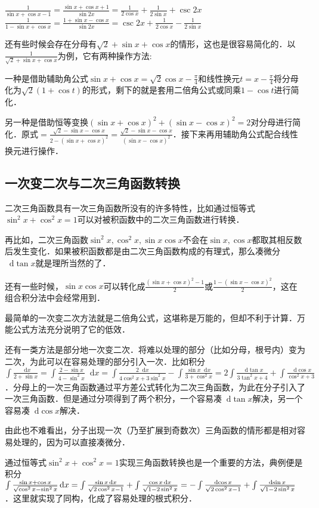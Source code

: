 \documentclass{ctexbook}
\newcommand*{\dif}{\mathop{}\!\mathrm{d}}
\begin{document}
$\frac{1}{\sin{x}+\cos{x}-1}=\frac{\sin{x}+\cos{x}+1}{\sin{2x}}=\frac{1}{2\cos{x}}+\frac{1}{2\sin{x}}+\csc{2x}$\\
$\frac{1}{1-\sin{x}+\cos{x}}=\frac{1+\sin{x}-\cos{x}}{\sin{2x}}=\csc{2x}+\frac{1}{2\cos{x}}-\frac{1}{2\sin{x}}$\par
还有些时候会存在分母有$\sqrt{2}+\sin{x}+\cos{x}$的情形，这也是很容易简化的．以$\frac{1}{\sqrt{2}+\sin{x}+\cos{x}}$为例，它有两种操作方法:\par
一种是借助辅助角公式$\sin{x}+\cos{x}=\sqrt{2}\cos{x-\frac{\pi}{4}}$和线性换元$t=x-\frac{\pi}{4}$将分母化为$\sqrt{2}\left(1+\cos{t}\right)$的形式，剩下的就是套用二倍角公式或同乘$1-\cos{t}$进行简化．\par
另一种是借助恒等变换$\left(\sin{x}+\cos{x}\right)^{2}+\left(\sin{x}-\cos{x}\right)^{2}=2$对分母进行简化．原式$=\frac{\sqrt{2}-\sin{x}-\cos{x}}{2-\left(\sin{x}+\cos{x}\right)^{2}}=\frac{\sqrt{2}-\sin{x}-\cos{x}}{\left(\sin{x}-\cos{x}\right)^{2}}$．接下来再用辅助角公式配合线性换元进行操作．\par
\subsection{一次变二次与二次三角函数转换}
二次三角函数具有一次三角函数所没有的许多特性，比如通过恒等式$\sin^{2}{x}+\cos^{2}{x}=1$可以对被积函数中的二次三角函数进行转换．\par
再比如，二次三角函数$\sin^{2}{x},\cos^{2}{x},\sin{x}\cos{x}$不会在$\sin{x},\cos{x}$都取其相反数后发生变化．如果被积函数都是由二次三角函数构成的有理式，那么凑微分$\dif{\tan{x}}$就是理所当然的了．\par
还有一些时候，$\sin{x}\cos{x}$可以转化成$\frac{\left(\sin{x}+\cos{x}\right)^{2}-1}{2}$或$\frac{1-\left(\sin{x}-\cos{x}\right)^{2}}{2}$，这在组合积分法中会经常用到．\par
最简单的一次变二次方法就是二倍角公式，这堪称是万能的，但却不利于计算．万能公式方法充分说明了它的低效．\par
还有一类方法是部分地一次变二次．将难以处理的部分（比如分母，根号内）变为二次，为此可以在容易处理的部分引入一次．比如积分$\int\frac{\dif{x}}{2+\sin{x}}=\int\frac{2-\sin{x}}{4-\sin^{2}{x}}\dif{x}=\int\frac{2\dif{x}}{4\cos^{2}{x}+3\sin^{2}{x}}-\int\frac{\sin{x}\dif{x}}{3+\cos^{2}{x}}=2\int\frac{\dif{\tan{x}}}{3\tan^{2}{x}+4}+\int\frac{\dif{\cos{x}}}{\cos^{2}{x}+3}$．分母上的一次三角函数通过平方差公式转化为二次三角函数，为此在分子引入了一次三角函数．但是通过分项得到了两个积分，一个容易凑$\dif{\tan{x}}$解决，另一个容易凑$\dif{\cos{x}}$解决．\par
由此也不难看出，分子出现一次（乃至扩展到奇数次）三角函数的情形都是相对容易处理的，因为可以直接凑微分．\par
通过恒等式$\sin^{2}{x}+\cos^{2}{x}=1$实现三角函数转换也是一个重要的方法，典例便是积分$\int\frac{\sin{x}+\cos{x}}{\sqrt{\cos^{2}{x}-\sin^{2}{x}}}\dif{x}\\=\int\frac{\sin{x}\dif{x}}{\sqrt{2\cos^{2}{x}-1}}+\int\frac{\cos{x}\dif{x}}{\sqrt{1-2\sin^{2}{x}}}=-\int\frac{\dif{\cos{x}}}{\sqrt{2\cos^{2}{x}-1}}+\int\frac{\dif{\sin{x}}}{\sqrt{1-2\sin^{2}{x}}}$．这里就实现了同构，化成了容易处理的根式积分．\par
\end{document}
